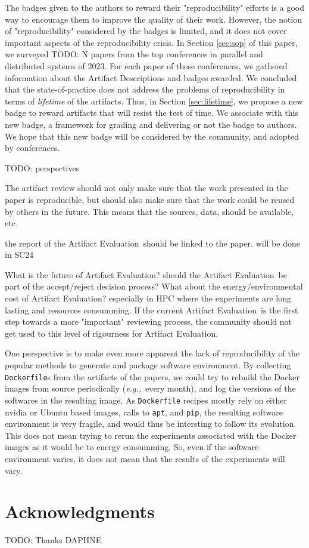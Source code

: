 \documentclass[sigconf,natbib=false]{acmart}
\newcommand{\eg}{\emph{e.g.,}}
\newcommand{\ad}{Artifact Description}
\newcommand{\aeval}{Artifact Evaluation}
\newcommand{\todo}[1]{{\color{red}TODO: #1}}
\begin{document}
The badges given to the authors to reward their "reproducibility" efforts is a good way to encourage them to improve the quality of their work.
However, the notion of "reproducibility" considered by the badges is limited, and it does not cover important aspects of the reproducibility crisis.
In Section \ref{sec:sop} of this paper, we surveyed \todo{N} papers from the top conferences in parallel and distributed systems of 2023.
For each paper of these conferences, we gathered information about the \ad s and badges awarded.
We concluded that the state-of-practice does not address the problems of reproducibility in terms of \emph{lifetime} of the artifacts.
Thus, in Section \ref{sec:lifetime}, we propose a new badge to reward artifacts that will resist the test of time.
We associate with this new badge, a framework for grading and delivering or not the badge to authors.
We hope that this new badge will be considered by the community, and adopted by conferences.


\todo{perspectives}

The artifact review should not only make sure that the work presented in the paper is reproducible, but should also make sure that the work could be reused by others in the future.
This means that the sources, data, should be available, etc.

the report of the \aeval\ should be linked to the paper.
will be done in SC24

What is the future of \aeval?
should the \aeval\ be part of the accept/reject decision process?
What about the energy/environmental cost of \aeval?
especially in HPC where the experiments are long lasting and resources consumming.
If the current \aeval\ is the first step towards a more "important" reviewing process, the community should not get used to this level of rigourness for \aeval.

One perspective is to make even more apparent the lack of reproducibility of the popular methods to generate and package software environment.
By collecting \texttt{Dockerfile}s from the artifacts of the papers, we could try to rebuild the Docker images from source periodically (\eg\ every month), and log the versions of the softwares in the resulting image.
As \texttt{Dockerfile} recipes mostly rely on either nvidia or Ubuntu based images, calls to \texttt{apt}, and \texttt{pip}, the resulting software environment is very fragile, and would thus be intersting to follow its evolution. 
This does not mean trying to rerun the experiments associated with the Docker images as it would be to energy consumming.
So, even if the software environment varies, it does not mean that the results of the experiments will vary.

\section*{Acknowledgments}

\todo{Thanks DAPHNE}


%
%
\printbibliography
\end{document}
